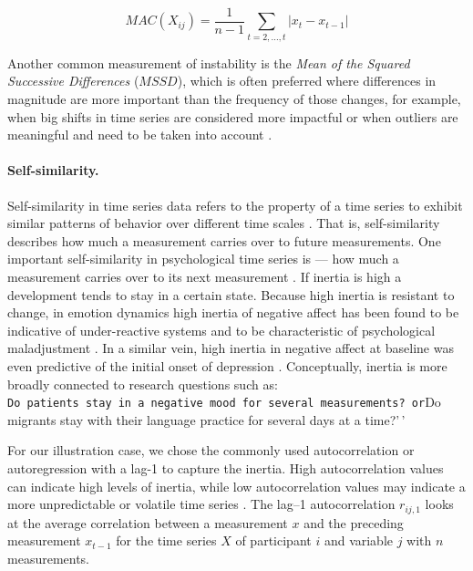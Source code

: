 \begin{equation} \label{eq:mac}
  MAC(X_{ij}) = \frac{1}{n-1} \sum_{t=2, \ldots, t}\left|x_{t}-x_{t-1}\right|
\end{equation}

Another common measurement of instability is the
\textit{Mean of the Squared Successive Differences} (\(MSSD\)), which is
often preferred where differences in magnitude are more important than
the frequency of those changes, for example, when big shifts in time
series are considered more impactful or when outliers are meaningful and
need to be taken into account \citep{chatfield2003}.

\paragraph{Self-similarity.}

Self-similarity in time series data refers to the property of a time
series to exhibit similar patterns of behavior over different time
scales \citep{dmello2021}. That is, self-similarity describes how much a
measurement carries over to future measurements. One important
self-similarity in psychological time series is  --- how
much a measurement carries over to its next measurement
\citep{kuppens2010, suls1998}. If inertia is high a development tends to
stay in a certain state. Because high inertia is resistant to change, in
emotion dynamics high inertia of negative affect has been found to be
indicative of under-reactive systems and to be characteristic of
psychological maladjustment \citep{kuppens2010}. In a similar vein, high
inertia in negative affect at baseline was even predictive of the
initial onset of depression \citep{kuppens2012}. Conceptually, inertia
is more broadly connected to research questions such as:
\texttt{Do\ patients\ stay\ in\ a\ negative\ mood\ for\ several\ measurements?\textquotesingle{}\textquotesingle{}\ or}Do
migrants stay with their language practice for several days at a
time?'\,'

For our illustration case, we chose the commonly used autocorrelation or
autoregression with a lag-1 to capture the inertia. High autocorrelation
values can indicate high levels of inertia, while low autocorrelation
values may indicate a more unpredictable or volatile time series
\citep{dejonckheere2019}. The lag--1 autocorrelation \(r_{ij,1}\) looks
at the average correlation between a measurement \(x\) and the preceding
measurement \(x_{t-1}\) for the time series \(X\) of participant \(i\)
and variable \(j\) with \(n\) measurements.

